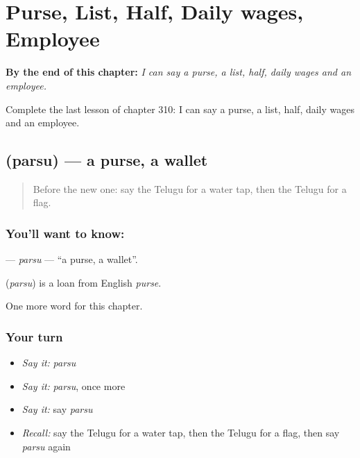 
\chapter{Purse, List, Half, Daily wages, Employee}
\label{ch:te-purse-list-half-daily-wages-employee}

\begin{chapteropening}
\textbf{By the end of this chapter:} \emph{I can say a purse, a list, half, daily wages and an employee.}

Complete the last lesson of chapter 310: I can say a purse, a list, half, daily wages and an employee.
\end{chapteropening}

\section[\texorpdfstring{\te{పర్సు} (parsu)}{పర్సు (parsu)}]{ (parsu) — a purse, a wallet}

\label{lesson:TE-C310-parsu}



\begin{quote}
Before the new one: say the Telugu for a water tap, then the Telugu for a flag.
\end{quote}

\subsection*{You'll want to know: }
\textbf{} — \emph{parsu} — \textquotedblleft{}a purse, a wallet\textquotedblright{}.

\begin{cousinweb}
\textbf{} (\emph{parsu}) is a loan from English \emph{purse}.
\end{cousinweb}

\begin{grammarlens}[title={What you've built}]
One more word for this chapter.
\end{grammarlens}

\subsection*{Your turn}
\begin{itemize}
\raggedright
  \item \emph{Say it:} \emph{parsu}
  \item \emph{Say it:} \emph{parsu}, once more
  \item \emph{Say it:} say \emph{parsu}
  \item \emph{Recall:} say the Telugu for a water tap, then the Telugu for a flag, then say \emph{parsu} again
\end{itemize}

